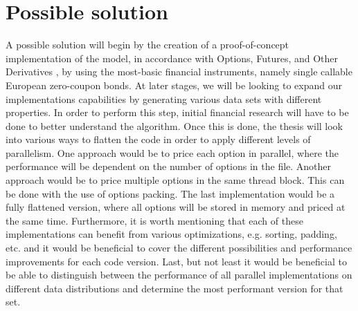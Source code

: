 \section{Possible solution}
\label{section:solution}
A possible solution will begin by the creation of a proof-of-concept implementation of the model, in accordance with Options, Futures, and Other Derivatives \cite{ofod}, by using the most-basic financial instruments, namely single callable European zero-coupon bonds. At later stages, we will be looking to expand our implementations capabilities by generating various data sets with different properties. In order to perform this step, initial financial research will have to be done to better understand the algorithm. Once this is done, the thesis will look into various ways to flatten the code in order to apply different levels of parallelism. One approach would be to price each option in parallel, where the performance will be dependent on the number of options in the file. Another approach would be to price multiple options in the same thread block. This can be done with the use of options packing. The last implementation would be a fully flattened version, where all options will be stored in memory and priced at the same time. Furthermore, it is worth mentioning that each of these implementations can benefit from various optimizations, e.g. sorting, padding, etc. and it would be beneficial to cover the different possibilities and performance improvements for each code version. Last, but not least it would be beneficial to be able to distinguish between the performance of all parallel implementations on different data distributions and determine the most performant version for that set.


